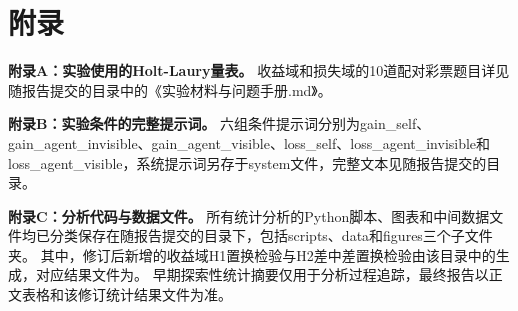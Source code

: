 \appendix
\section{附录}

\noindent\textbf{附录A：实验使用的Holt-Laury量表。}
收益域和损失域的10道配对彩票题目详见随报告提交的目录中的《实验材料与问题手册.md》。\par
\noindent\textbf{附录B：实验条件的完整提示词。}
六组条件提示词分别为gain\_self、gain\_agent\_invisible、gain\_agent\_visible、loss\_self、loss\_agent\_invisible和loss\_agent\_visible，系统提示词另存于system文件，完整文本见随报告提交的目录。\par
\noindent\textbf{附录C：分析代码与数据文件。}
所有统计分析的Python脚本、图表和中间数据文件均已分类保存在随报告提交的目录下，包括scripts、data和figures三个子文件夹。
其中，修订后新增的收益域H1置换检验与H2差中差置换检验由该目录中的生成，对应结果文件为。
早期探索性统计摘要仅用于分析过程追踪，最终报告以正文表格和该修订统计结果文件为准。
